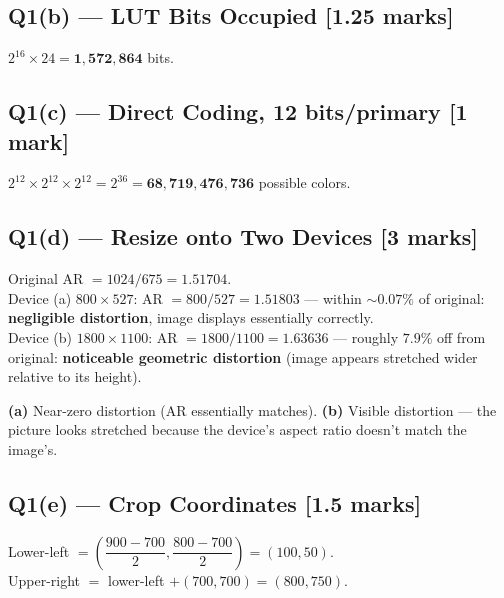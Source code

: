 \documentclass[12pt, a4paper]{article}
\newenvironment{solutionbox}{\begin{mdframed}[style=solutionframe]}{\end{mdframed}}
\newenvironment{answerbox}{\begin{mdframed}[style=answerframe]}{\end{mdframed}}
\begin{document}
\subsection*{Q1(b) --- LUT Bits Occupied [1.25 marks]}
\begin{answerbox}
$2^{16} \times 24 = \mathbf{1{,}572{,}864}$ bits.
\end{answerbox}

\subsection*{Q1(c) --- Direct Coding, 12 bits/primary [1 mark]}
\begin{answerbox}
$2^{12} \times 2^{12} \times 2^{12} = 2^{36} = \mathbf{68{,}719{,}476{,}736}$ possible colors.
\end{answerbox}

\subsection*{Q1(d) --- Resize onto Two Devices [3 marks]}
\begin{solutionbox}
Original AR $= 1024/675 = 1.51704$. \\
Device (a) $800\times527$: AR $= 800/527 = 1.51803$ --- within $\sim 0.07\%$ of original: \textbf{negligible distortion}, image displays essentially correctly. \\
Device (b) $1800\times1100$: AR $= 1800/1100 = 1.63636$ --- roughly $7.9\%$ off from original: \textbf{noticeable geometric distortion} (image appears stretched wider relative to its height).
\end{solutionbox}
\begin{answerbox}
\textbf{(a)} Near-zero distortion (AR essentially matches). \textbf{(b)} Visible distortion --- the picture looks stretched because the device's aspect ratio doesn't match the image's.
\end{answerbox}

\subsection*{Q1(e) --- Crop Coordinates [1.5 marks]}
\begin{answerbox}
Lower-left $= \left(\dfrac{900-700}{2}, \dfrac{800-700}{2}\right) = (100, 50)$. \\
Upper-right $=$ lower-left $+ (700,700) = (800, 750)$.
\end{answerbox}

\end{document}
